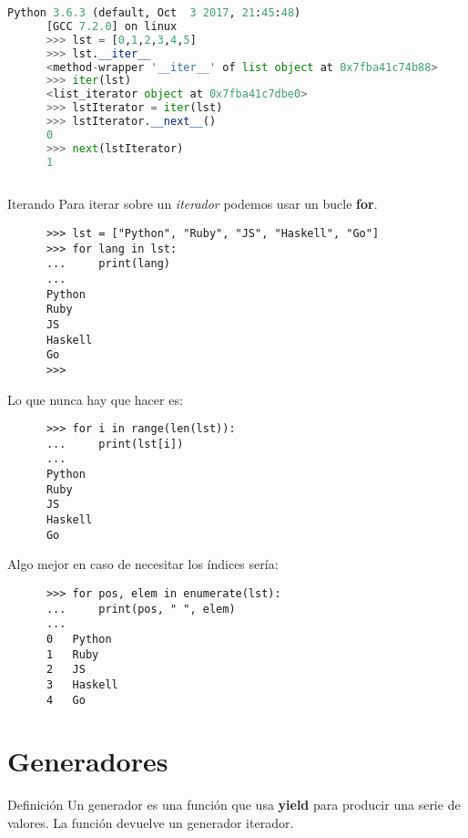 \documentclass[spanish]{beamer}
\begin{document}
  \begin{frame}[fragile]
    
    \begin{lstlisting}[language=Python,keywordstyle=\bf,stringstyle=\it]
      Python 3.6.3 (default, Oct  3 2017, 21:45:48) 
      [GCC 7.2.0] on linux
      >>> lst = [0,1,2,3,4,5]
      >>> lst.__iter__
      <method-wrapper '__iter__' of list object at 0x7fba41c74b88>
      >>> iter(lst)
      <list_iterator object at 0x7fba41c7dbe0>
      >>> lstIterator = iter(lst)
      >>> lstIterator.__next__()
      0
      >>> next(lstIterator)
      1
      
    \end{lstlisting}
    
  \end{frame}

  \begin{frame}[fragile]{Iterando}
    Para iterar sobre un \textit{iterador} podemos usar un bucle \textbf{for}.

    \begin{lstlisting}
      >>> lst = ["Python", "Ruby", "JS", "Haskell", "Go"]
      >>> for lang in lst:
      ...     print(lang)
      ... 
      Python
      Ruby
      JS
      Haskell
      Go
      >>> 
    \end{lstlisting}
  \end{frame}

  \begin{frame}[fragile]
    Lo que nunca hay que hacer es:

    \begin{lstlisting}
      >>> for i in range(len(lst)):
      ...     print(lst[i])
      ... 
      Python
      Ruby
      JS
      Haskell
      Go

    \end{lstlisting}

    Algo mejor en caso de necesitar los índices sería:

    \begin{lstlisting}
      >>> for pos, elem in enumerate(lst):
      ...     print(pos, " ", elem)
      ... 
      0   Python
      1   Ruby
      2   JS
      3   Haskell
      4   Go
    \end{lstlisting}
  \end{frame}

  \section{Generadores}
  \begin{frame}{Definición}
    Un generador es una función que usa \textbf{yield} para producir
    una serie de valores. La función devuelve un generador iterador.
  \end{frame}
\end{document}
